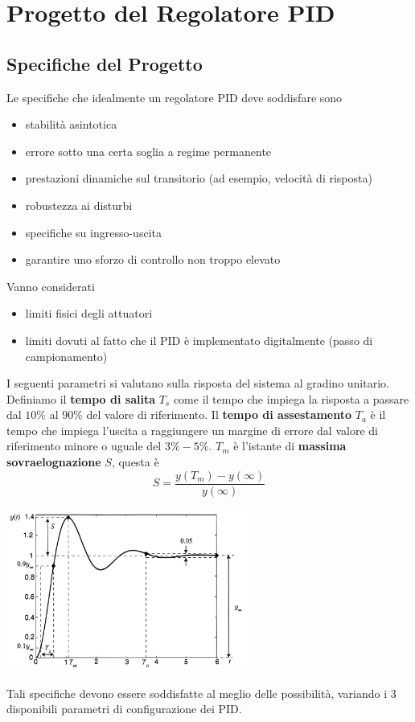\documentclass[10pt, letterpaper]{report}
\begin{document}
\section{Progetto del Regolatore PID}
\subsection{Specifiche del Progetto}
Le specifiche che idealmente un regolatore PID deve soddisfare sono\begin{itemize}
    \item stabilità asintotica 
    \item errore sotto una certa soglia a regime permanente 
    \item prestazioni dinamiche sul transitorio (ad esempio, velocità di risposta)
    \item robustezza ai disturbi 
    \item specifiche su ingresso-uscita 
    \item garantire uno sforzo di controllo non troppo elevato 
\end{itemize}
Vanno considerati \begin{itemize}
    \item limiti fisici degli attuatori 
    \item limiti dovuti al fatto che il PID è implementato digitalmente (passo di campionamento)
\end{itemize}
I seguenti parametri si valutano sulla risposta del sistema al gradino unitario.
Definiamo il \textbf{tempo di salita} $T_s$ come il tempo che impiega la risposta a passare dal $10\%$ al $90\%$ del valore di riferimento.\acc 
Il \textbf{tempo di assestamento} $T_a$ è il tempo che impiega l'uscita a raggiungere un margine di errore dal valore di riferimento minore o uguale del $3\%-5\%$.\acc 
$T_m$ è l'istante di \textbf{massima sovraelognazione} $S$, questa è 
$$S=\frac{y(T_m)-y(\infty)}{y(\infty)} $$
\begin{center}
    \includegraphics[width=0.6\textwidth]{images/specifiche.pdf} 
\end{center}
Tali specifiche devono essere soddisfatte al meglio delle possibilità, variando i 3 disponibili parametri di configurazione dei PID.
\end{document}
